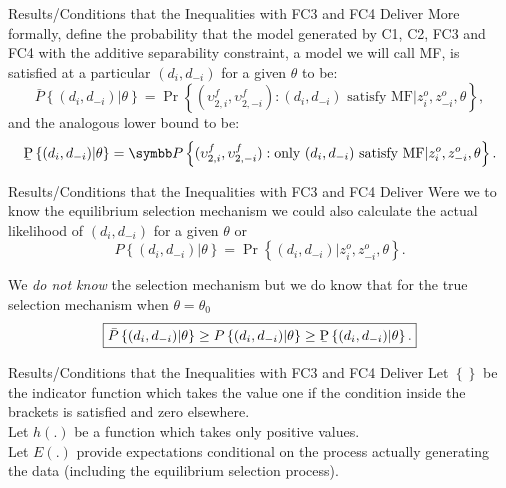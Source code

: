 \documentclass[aspectratio=169,11pt]{beamer}
\begin{document}
\begin{frame}{\normalsize Results/Conditions that the Inequalities with FC3 and FC4 Deliver}
More formally, define the probability that the model generated by C1, C2,
FC3 and FC4 with the additive separability constraint, a model we will call
MF, is satisfied at a particular $(d_{i},d_{-i})$ for a given $\theta $ to
be: 
\begin{equation*}
\bar{P}\left\{ (d_{i},d_{-i})|\theta \right\} =\Pr \left\{ (\upsilon
_{2,i}^{f},\upsilon _{2,-i}^{f}):(d_{i},d_{-i})\text{ satisfy MF}%
|z_{i}^{o},z_{-i}^{o},\theta \right\} ,
\end{equation*}%
and the analogous lower bound to be:%
\begin{equation*}
\text{\b{P}}\left\{ (d_{i},d_{-i})|\theta \right\} =\Pr \left\{ (\upsilon
_{2,i}^{f},\upsilon _{2,-i}^{f}):\text{only }(d_{i},d_{-i})\text{ satisfy MF}%
|z_{i}^{o},z_{-i}^{o},\theta \right\} .
\end{equation*}
\end{frame}

\begin{frame}{\normalsize Results/Conditions that the Inequalities with FC3 and FC4 Deliver}
Were we to know the equilibrium selection mechanism we could also calculate
the actual likelihood of $(d_{i},d_{-i})$ for a given $\theta $ or%
\begin{equation*}
P\left\{ (d_{i},d_{-i})|\theta \right\} =\Pr \left\{
(d_{i},d_{-i})|z_{i}^{o},z_{-i}^{o},\theta \right\} .
\end{equation*}

We \textit{do not know} the selection mechanism but we do know that for the true
selection mechanism when $\theta =\theta _{0}$%
\begin{equation*}
\boxed{\bar{P}\left\{ (d_{i},d_{-i})|\theta \right\} \geq P\left\{
(d_{i},d_{-i})|\theta \right\} \geq \text{\b{P}}\left\{
(d_{i},d_{-i})|\theta \right\} .}
\end{equation*}
\end{frame}

\begin{frame}{\normalsize Results/Conditions that the Inequalities with FC3 and FC4 Deliver}
Let $\left\{ {}\right\}$ be the indicator function which takes the value
one if the condition inside the brackets is satisfied and zero elsewhere.\\
\vspace{0.2in}
Let $h(.)$ be a function which takes only positive values.\\
\vspace{0.2in}
Let $E(.)$ provide expectations conditional on the process actually generating the data
(including the equilibrium selection process).
\end{frame}
\end{document}
